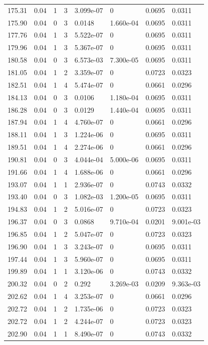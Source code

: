 \documentclass[preview]{standalone}
\begin{document}
{{{\begin{tabular}{L{1.2cm}C{1.2cm} C{0.3cm}C{0.5cm} C{1.4cm}C{1.4cm} C{1.4cm}C{1.4cm}}
  175.31  &  0.04  & 1     &  3 &  3.099e-07  & 0  & 0.0695 &  0.0311   \\ 
  175.90  &  0.04  & 0     &  3 &  0.0148  & 1.660e-04  & 0.0695 &  0.0311   \\ 
  177.76  &  0.04  & 1     &  3 &  5.522e-07  & 0  & 0.0695 &  0.0311   \\ 
  179.96  &  0.04  & 1     &  3 &  5.367e-07  & 0  & 0.0695 &  0.0311   \\ 
  180.58  &  0.04  & 0     &  3 &  6.573e-03  & 7.300e-05  & 0.0695 &  0.0311   \\ 
  181.05  &  0.04  & 1     &  2 &  3.359e-07  & 0  & 0.0723 &  0.0323   \\ 
  182.51  &  0.04  & 1     &  4 &  5.474e-07  & 0  & 0.0661 &  0.0296   \\ 
  184.13  &  0.04  & 0     &  3 &  0.0106  & 1.180e-04  & 0.0695 &  0.0311   \\ 
  186.28  &  0.04  & 0     &  3 &  0.0129  & 1.440e-04  & 0.0695 &  0.0311   \\ 
  187.94  &  0.04  & 1     &  4 &  4.760e-07  & 0  & 0.0661 &  0.0296   \\ 
  188.11  &  0.04  & 1     &  3 &  1.224e-06  & 0  & 0.0695 &  0.0311   \\ 
  189.51  &  0.04  & 1     &  4 &  2.274e-06  & 0  & 0.0661 &  0.0296   \\ 
  190.81  &  0.04  & 0     &  3 &  4.044e-04  & 5.000e-06  & 0.0695 &  0.0311   \\ 
  191.66  &  0.04  & 1     &  4 &  1.688e-06  & 0  & 0.0661 &  0.0296   \\ 
  193.07  &  0.04  & 1     &  1 &  2.936e-07  & 0  & 0.0743 &  0.0332   \\ 
  193.40  &  0.04  & 0     &  3 &  1.082e-03  & 1.200e-05  & 0.0695 &  0.0311   \\ 
  194.83  &  0.04  & 1     &  2 &  5.016e-07  & 0  & 0.0723 &  0.0323   \\ 
  196.37  &  0.04  & 0     &  3 &  0.0868  & 9.710e-04  & 0.0201 &  9.001e-03   \\ 
  196.85  &  0.04  & 1     &  2 &  5.047e-07  & 0  & 0.0723 &  0.0323   \\ 
  196.90  &  0.04  & 1     &  3 &  3.243e-07  & 0  & 0.0695 &  0.0311   \\ 
  197.44  &  0.04  & 1     &  3 &  5.960e-07  & 0  & 0.0695 &  0.0311   \\ 
  199.89  &  0.04  & 1     &  1 &  3.120e-06  & 0  & 0.0743 &  0.0332   \\ 
  200.32  &  0.04  & 0     &  2 &  0.292  & 3.269e-03  & 0.0209 &  9.363e-03   \\ 
  202.62  &  0.04  & 1     &  4 &  3.253e-07  & 0  & 0.0661 &  0.0296   \\ 
  202.72  &  0.04  & 1     &  2 &  1.735e-06  & 0  & 0.0723 &  0.0323   \\ 
  202.72  &  0.04  & 1     &  2 &  4.244e-07  & 0  & 0.0723 &  0.0323   \\ 
  202.90  &  0.04  & 1     &  1 &  8.490e-07  & 0  & 0.0743 &  0.0332   \\ 
\hline 
\end{tabular} 

}}}
\end{document}
